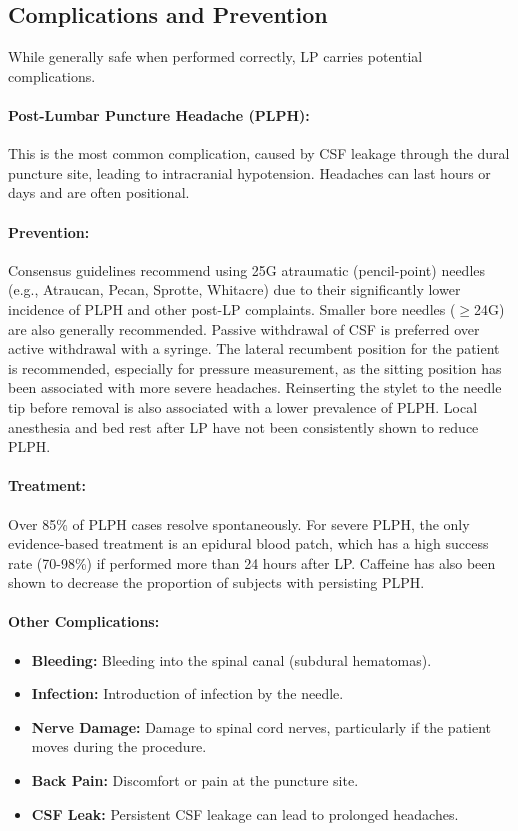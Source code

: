 \subsection{Complications and Prevention}
	
While generally safe when performed correctly, LP carries potential complications.
	
\paragraph{Post-Lumbar Puncture Headache (PLPH):} This is the most common complication, caused by CSF leakage through the dural puncture site, leading to intracranial hypotension. Headaches can last hours or days and are often positional.
	
\paragraph{Prevention:} Consensus guidelines recommend using 25G atraumatic (pencil-point) needles (e.g., Atraucan, Pecan, Sprotte, Whitacre) due to their significantly lower incidence of PLPH and other post-LP complaints. Smaller bore needles ($\ge$24G) are also generally recommended. Passive withdrawal of CSF is preferred over active withdrawal with a syringe. The lateral recumbent position for the patient is recommended, especially for pressure measurement, as the sitting position has been associated with more severe headaches. Reinserting the stylet to the needle tip before removal is also associated with a lower prevalence of PLPH. Local anesthesia and bed rest after LP have not been consistently shown to reduce PLPH.
	
\paragraph{Treatment:} Over 85\% of PLPH cases resolve spontaneously. For severe PLPH, the only evidence-based treatment is an epidural blood patch, which has a high success rate (70-98\%) if performed more than 24 hours after LP. Caffeine has also been shown to decrease the proportion of subjects with persisting PLPH.
	
\paragraph{Other Complications:}
	\begin{itemize}
		\item \textbf{Bleeding:} Bleeding into the spinal canal (subdural hematomas).
		\item \textbf{Infection:} Introduction of infection by the needle.
		\item \textbf{Nerve Damage:} Damage to spinal cord nerves, particularly if the patient moves during the procedure.
		\item \textbf{Back Pain:} Discomfort or pain at the puncture site.
		\item \textbf{CSF Leak:} Persistent CSF leakage can lead to prolonged headaches.
	\end{itemize}
	
